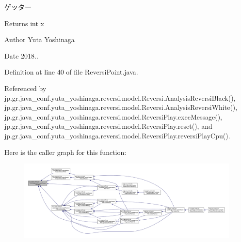 ゲッター 

\begin{DoxyReturn}{Returns}
int x 
\end{DoxyReturn}
\begin{DoxyAuthor}{Author}
Yuta Yoshinaga 
\end{DoxyAuthor}
\begin{DoxyDate}{Date}
2018.. 
\end{DoxyDate}


Definition at line 40 of file Reversi\+Point.\+java.



Referenced by jp.\+gr.\+java\+\_\+conf.\+yuta\+\_\+yoshinaga.\+reversi.\+model.\+Reversi.\+Analysis\+Reversi\+Black(), jp.\+gr.\+java\+\_\+conf.\+yuta\+\_\+yoshinaga.\+reversi.\+model.\+Reversi.\+Analysis\+Reversi\+White(), jp.\+gr.\+java\+\_\+conf.\+yuta\+\_\+yoshinaga.\+reversi.\+model.\+Reversi\+Play.\+exec\+Message(), jp.\+gr.\+java\+\_\+conf.\+yuta\+\_\+yoshinaga.\+reversi.\+model.\+Reversi\+Play.\+reset(), and jp.\+gr.\+java\+\_\+conf.\+yuta\+\_\+yoshinaga.\+reversi.\+model.\+Reversi\+Play.\+reversi\+Play\+Cpu().

Here is the caller graph for this function\+:
\nopagebreak
\begin{figure}[H]
\begin{center}
\leavevmode
\includegraphics[width=350pt]{classjp_1_1gr_1_1java__conf_1_1yuta__yoshinaga_1_1reversi_1_1model_1_1_reversi_point_ae95551c470eb4dd9dd21547fa479aee9_icgraph}
\end{center}
\end{figure}
\mbox{\label{classjp_1_1gr_1_1java__conf_1_1yuta__yoshinaga_1_1reversi_1_1model_1_1_reversi_point_a798959fea536c8bbbcaa9e7b447037ea}} 
